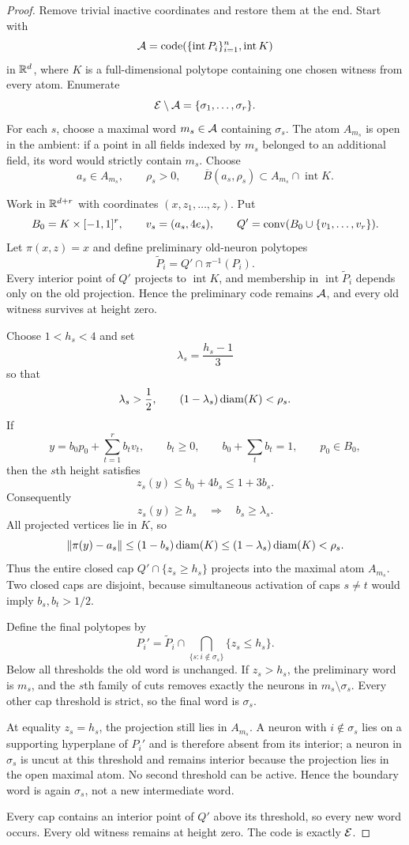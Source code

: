 \begin{proof}
Remove trivial inactive coordinates and restore them at the end.  Start with
\[
 \mathcal A=\operatorname{code}(\{\operatorname{int}P_i\}_{i=1}^n,\operatorname{int}K)
\]
in $\mathbb R^d$, where $K$ is a full-dimensional polytope containing one chosen witness from every atom.  Enumerate
\[
 \mathcal E\setminus\mathcal A=\{\sigma_1,\ldots,\sigma_r\}.
\]
For each $s$, choose a maximal word $m_s\in\mathcal A$ containing $\sigma_s$.  The atom $A_{m_s}$ is open in the ambient: if a point in all fields indexed by $m_s$ belonged to an additional field, its word would strictly contain $m_s$.  Choose
\[
 a_s\in A_{m_s},\qquad \rho_s>0,
 \qquad \overline B(a_s,\rho_s)\subset A_{m_s}\cap\operatorname{int}K.
\]

Work in $\mathbb R^{d+r}$ with coordinates $(x,z_1,\ldots,z_r)$.  Put
\[
 B_0=K\times[-1,1]^r,
 \qquad v_s=(a_s,4e_s),
 \qquad Q'=\operatorname{conv}(B_0\cup\{v_1,\ldots,v_r\}).
\]
Let $\pi(x,z)=x$ and define preliminary old-neuron polytopes
\[
 \widetilde P_i=Q'\cap\pi^{-1}(P_i).
\]
Every interior point of $Q'$ projects to $\operatorname{int}K$, and membership in $\operatorname{int}\widetilde P_i$ depends only on the old projection.  Hence the preliminary code remains $\mathcal A$, and every old witness survives at height zero.

Choose $1<h_s<4$ and set
\[
 \lambda_s=\frac{h_s-1}{3}
\]
so that
\[
 \lambda_s>\frac12,
 \qquad
 (1-\lambda_s)\operatorname{diam}(K)<\rho_s.
\]
If
\[
 y=b_0p_0+\sum_{t=1}^rb_tv_t,
 \qquad b_t\ge0,
 \qquad b_0+\sum_tb_t=1,
 \qquad p_0\in B_0,
\]
then the $s$th height satisfies
\[
 z_s(y)\le b_0+4b_s\le 1+3b_s.
\]
Consequently
\[
 z_s(y)\ge h_s\quad\Longrightarrow\quad b_s\ge\lambda_s.
\]
All projected vertices lie in $K$, so
\[
 \|\pi(y)-a_s\|
 \le(1-b_s)\operatorname{diam}(K)
 \le(1-\lambda_s)\operatorname{diam}(K)<\rho_s.
\]
Thus the entire closed cap $Q'\cap\{z_s\ge h_s\}$ projects into the maximal atom $A_{m_s}$.  Two closed caps are disjoint, because simultaneous activation of caps $s\ne t$ would imply $b_s,b_t>1/2$.

Define the final polytopes by
\[
 P_i'=\widetilde P_i\cap
 \bigcap_{\{s:i\notin\sigma_s\}}\{z_s\le h_s\}.
\]
Below all thresholds the old word is unchanged.  If $z_s>h_s$, the preliminary word is $m_s$, and the $s$th family of cuts removes exactly the neurons in $m_s\setminus\sigma_s$.  Every other cap threshold is strict, so the final word is $\sigma_s$.

At equality $z_s=h_s$, the projection still lies in $A_{m_s}$.  A neuron with $i\notin\sigma_s$ lies on a supporting hyperplane of $P_i'$ and is therefore absent from its interior; a neuron in $\sigma_s$ is uncut at this threshold and remains interior because the projection lies in the open maximal atom.  No second threshold can be active.  Hence the boundary word is again $\sigma_s$, not a new intermediate word.

Every cap contains an interior point of $Q'$ above its threshold, so every new word occurs.  Every old witness remains at height zero.  The code is exactly $\mathcal E$.
\end{proof}

